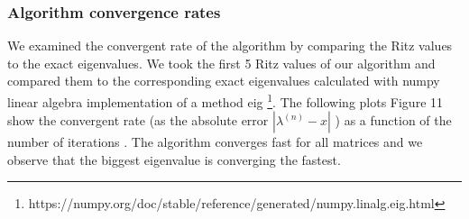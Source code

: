 \documentclass{article}
\numberwithin{equation}{section}
\begin{document}
\subsubsection{Algorithm convergence rates}
We examined the convergent rate of the algorithm by comparing the Ritz values  to the exact eigenvalues.  We took the first 5 Ritz values of our algorithm and compared them to the corresponding exact eigenvalues calculated  with numpy linear algebra implementation of a method eig \footnote{https://numpy.org/doc/stable/reference/generated/numpy.linalg.eig.html}.
The following plots Figure 11 show  the convergent rate (as the absolute error  $|\lambda^{(n)} - x|$ ) as a function of the number of iterations \cite[pg.~261-265]{qr}. The algorithm converges fast for  all matrices and  we observe that the biggest  eigenvalue  is converging the fastest. 
\begin{figure}[H]
    \centering
    \qquad
    

\end{figure}
\end{document}
